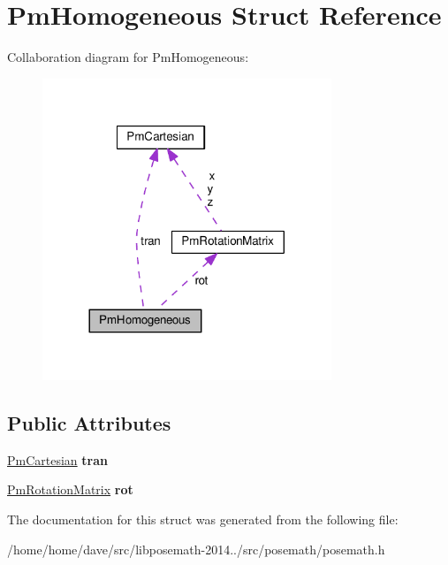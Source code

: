 \hypertarget{structPmHomogeneous}{}\section{Pm\+Homogeneous Struct Reference}
\label{structPmHomogeneous}


Collaboration diagram for Pm\+Homogeneous\+:
\nopagebreak
\begin{figure}[H]
\begin{center}
\leavevmode
\includegraphics[width=245pt]{structPmHomogeneous__coll__graph}
\end{center}
\end{figure}
\subsection*{Public Attributes}
\begin{DoxyCompactItemize}
\item 
\hypertarget{structPmHomogeneous_ae324a04f02ac177db35cbcb919a64f1e}{}\hyperlink{structPmCartesian}{Pm\+Cartesian} {\bfseries tran}\label{structPmHomogeneous_ae324a04f02ac177db35cbcb919a64f1e}

\item 
\hypertarget{structPmHomogeneous_a697360580aaa1b6a697182fc67349ed2}{}\hyperlink{structPmRotationMatrix}{Pm\+Rotation\+Matrix} {\bfseries rot}\label{structPmHomogeneous_a697360580aaa1b6a697182fc67349ed2}

\end{DoxyCompactItemize}


The documentation for this struct was generated from the following file\+:\begin{DoxyCompactItemize}
\item 
/home/home/dave/src/libposemath-\/2014../src/posemath/posemath.\+h\end{DoxyCompactItemize}
